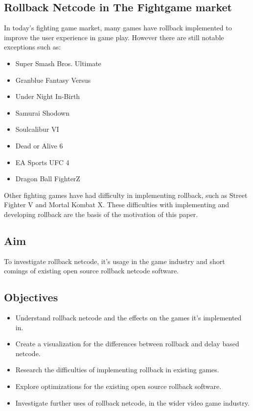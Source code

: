 \documentclass{entcs}
\begin{document}
\subsection{Rollback Netcode in The Fightgame market}
In today's fighting game market, many games have rollback \cite{GamesWithRollback} implemented to improve the user experience in game play. However there are still notable exceptions such as:
\begin{itemize}
\item Super Smash Bros. Ultimate\cite{SSBU}
\item Granblue Fantasy Versus\cite{GBFV}
\item Under Night In-Birth\cite{UNI}
\item Samurai Shodown\cite{SamSho}
\item Soulcalibur VI\cite{SVI}
\item Dead or Alive 6\cite{DOA6}
\item EA Sports UFC 4\cite{UFC4}
\item Dragon Ball FighterZ\cite{DBFZ}
\end{itemize}

Other fighting games have had difficulty in implementing rollback, such as Street Fighter V and Mortal Kombat X.
These difficulties with implementing and developing rollback are the basis of the motivation of this paper.

\subsection{Aim}
To investigate rollback netcode, it's usage in the game industry and short comings of existing open source rollback netcode software.
\subsection{Objectives}
\begin{itemize}
\item Understand rollback netcode and the effects on the games it's implemented in.
\item Create a visualization for the differences between rollback and delay based netcode.
\item Research the difficulties of implementing rollback in existing games.
\item Explore optimizations for the existing open source rollback software.
\item Investigate further uses of rollback netcode, in the wider video game industry.
\end{itemize}
\newpage
\end{document}
